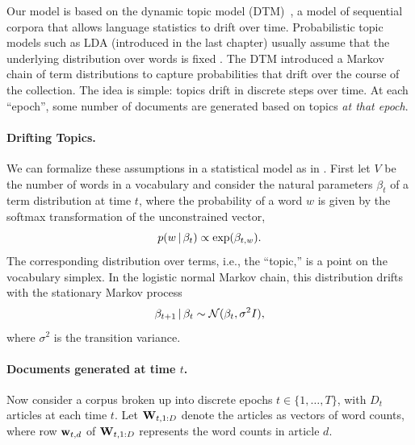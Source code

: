 Our model is based on the dynamic topic model (DTM)~\citep{blei:2006},
a model of sequential corpora that allows language statistics to drift
over time.  Probabilistic topic models such as LDA (introduced in the
last chapter) usually assume that the underlying distribution over
words is fixed \citep{blei:2003,deerwester:1990,hofmann:1999}. The DTM
introduced a Markov chain of term distributions to capture
probabilities that drift over the course of the collection.  The idea
is simple: topics drift in discrete steps over time.  At each
``epoch'', some number of documents are generated based on topics \emph{at that epoch}.

\paragraph{Drifting Topics.} We can formalize these assumptions in a
statistical model as in \cite{blei:2006}.  First let
$V$ be the number of words in a vocabulary and consider the natural
parameters $\beta_t$ of a term distribution at time $t$, where the
probability of a word $w$ is given by the softmax transformation of
the unconstrained vector,
\begin{equation}
  \label{eq:softmax}
  p(w \, | \, \beta_{t}) \propto \exp(\beta_{t,w}).
\end{equation}
The corresponding distribution over terms, i.e., the ``topic,'' is a
point on the vocabulary simplex.  In the logistic normal Markov chain,
this distribution drifts with the stationary Markov process
\begin{equation}
  \label{eq:logistic-normal}
  \beta_{t+1} \, | \, \beta_t \sim \mathcal{N}(\beta_{t}, \sigma^2 I),
\end{equation}
where $\sigma^2$ is the transition variance. 

\paragraph{Documents generated at time $t$.} Now consider a corpus
broken up into discrete epochs $t \in \{ 1, \ldots, T \}$, with $D_t$
articles at each time $t$.  Let $\textbf{W}_{t,1:D}$ denote the articles as
vectors of word counts, where row $\textbf{w}_{t,d}$ of $\textbf{W}_{t, 1:D}$
represents the word counts in article $d$.

